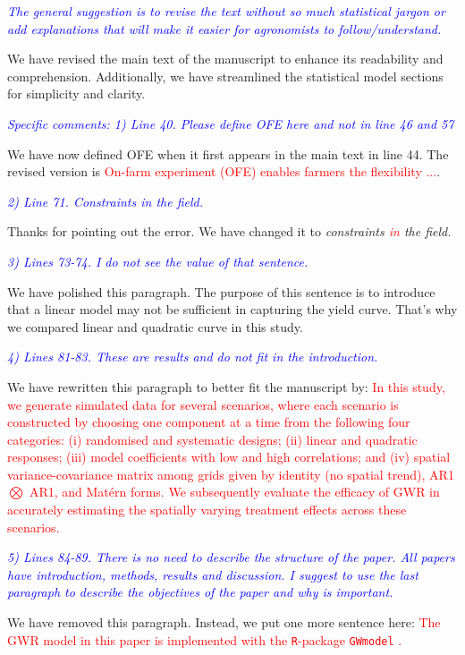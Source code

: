 \documentclass[a4paper]{article}   	%
\newcommand{\R}{\texttt{R}}
\newcommand{\revision}[1]{\textcolor{red}{#1}}
\newcommand{\reviewer}[1]{\textcolor{blue}{\textit{#1}}}
\begin{document}
\reviewer{The general suggestion is to revise the text without so much statistical jargon or add explanations that will make it easier for agronomists to follow/understand.}

We have revised the main text of the manuscript to enhance its readability and comprehension. Additionally, we have streamlined the statistical model sections for simplicity and clarity.



\reviewer{Specific comments: 1) Line 40. Please define OFE here and not in line 46 and 57}

We have now defined OFE when it first appears in the main text in line 44. The revised version is \revision{On-farm experiment (OFE) enables farmers the flexibility ...}. 


\reviewer{2) Line 71. Constraints in the field.}

Thanks for pointing out the error. We have changed it to \textit{constraints \revision{in} the field.}

\reviewer{3) Lines 73-74. I do not see the value of that sentence.}

We have polished this paragraph. The purpose of this sentence is to introduce that a linear model may not be sufficient in capturing the yield curve. That's why we compared linear and quadratic curve in this study. 


\reviewer{4) Lines 81-83. These are results and do not fit in the introduction.}

We have rewritten this paragraph to better fit the manuscript by:
\revision{In this study, we generate simulated data for several scenarios, where each scenario is constructed by choosing one component at a time from the following four categories: (i) randomised and systematic designs; (ii) linear and quadratic responses; (iii) model coefficients with low and high correlations; and (iv) spatial variance-covariance matrix  among grids given by identity (no spatial trend), AR1 $\bigotimes$ AR1, and Mat\'{e}rn forms. We subsequently evaluate the efficacy of GWR in accurately estimating the spatially varying treatment effects across these scenarios.}

\reviewer{5) Lines 84-89. There is no need to describe the structure of the paper. All papers have introduction, methods, results and discussion. I suggest to use the last paragraph to describe the objectives of the paper and why is important.}

We have removed this paragraph. Instead, we put one more sentence here: 
\revision{The GWR model in this paper is implemented with the \R-package \texttt{GWmodel} \parencite{lu2014gwmodel, Gollini2015GWmodel}.}
\end{document}
